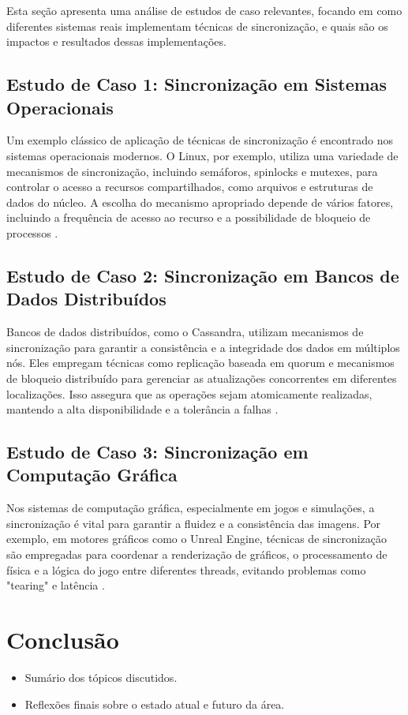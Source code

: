 \documentclass[conference]{IEEEtran}
\begin{document}
Esta seção apresenta uma análise de estudos de caso relevantes, focando em como diferentes sistemas reais implementam técnicas de sincronização, e quais são os impactos e resultados dessas implementações.

\subsection{Estudo de Caso 1: Sincronização em Sistemas Operacionais}
Um exemplo clássico de aplicação de técnicas de sincronização é encontrado nos sistemas operacionais modernos. O Linux, por exemplo, utiliza uma variedade de mecanismos de sincronização, incluindo semáforos, spinlocks e mutexes, para controlar o acesso a recursos compartilhados, como arquivos e estruturas de dados do núcleo. A escolha do mecanismo apropriado depende de vários fatores, incluindo a frequência de acesso ao recurso e a possibilidade de bloqueio de processos \cite{love2010linux}.

\subsection{Estudo de Caso 2: Sincronização em Bancos de Dados Distribuídos}
Bancos de dados distribuídos, como o Cassandra, utilizam mecanismos de sincronização para garantir a consistência e a integridade dos dados em múltiplos nós. Eles empregam técnicas como replicação baseada em quorum e mecanismos de bloqueio distribuído para gerenciar as atualizações concorrentes em diferentes localizações. Isso assegura que as operações sejam atomicamente realizadas, mantendo a alta disponibilidade e a tolerância a falhas \cite{lakshman2010cassandra}.

\subsection{Estudo de Caso 3: Sincronização em Computação Gráfica}
Nos sistemas de computação gráfica, especialmente em jogos e simulações, a sincronização é vital para garantir a fluidez e a consistência das imagens. Por exemplo, em motores gráficos como o Unreal Engine, técnicas de sincronização são empregadas para coordenar a renderização de gráficos, o processamento de física e a lógica do jogo entre diferentes threads, evitando problemas como "tearing" e latência \cite{gregory2014game}.

\section{Conclusão}
\begin{itemize}
    \item Sumário dos tópicos discutidos.
    \item Reflexões finais sobre o estado atual e futuro da área.
\end{itemize}
\end{document}
